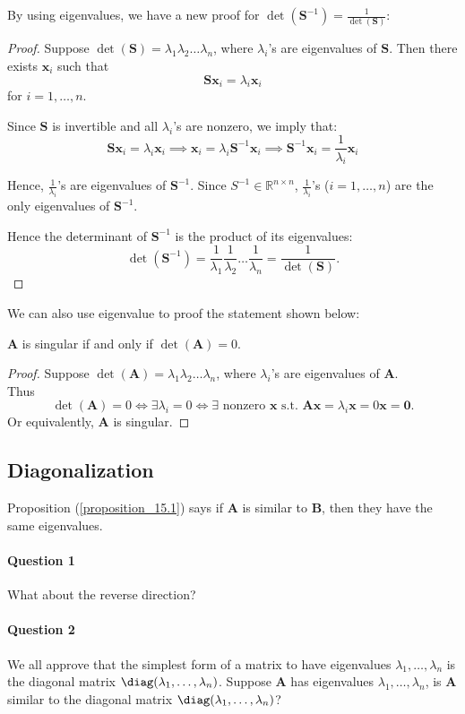 By using eigenvalues, we have a new proof for $\det(\bm S^{-1})=\frac{1}{\det(\bm S)}$:
\begin{proof}
Suppose $\det(\bm S)=\lambda_1\lambda_2\dots\lambda_n$, where $\lambda_i$'s are eigenvalues of $\bm S$. Then there exists $\bm x_i$ such that
\[
\bm S\bm x_i=\lambda_i\bm x_i
\]
for $i=1,\dots,n$.

Since $\bm S$ is invertible and all $\lambda_i$'s are nonzero, we imply that:
\[
\bm S\bm x_i=\lambda_i\bm x_i
\implies
\bm x_i=\lambda_i\bm S^{-1}\bm x_i
\implies
\bm S^{-1}\bm x_i=\frac{1}{\lambda_i}\bm x_i
\]

Hence, $\frac{1}{\lambda_i}$'s are eigenvalues of $\bm S^{-1}$. Since $S^{-1}\in\mathbb{R}^{n\times n}$, $\frac{1}{\lambda_i}$'s ($i=1,\dots,n$) are the only eigenvalues of $\bm S^{-1}$.

Hence the determinant of $\bm S^{-1}$ is the product of its eigenvalues:
\[
\det(\bm S^{-1})=\frac{1}{\lambda_1}\frac{1}{\lambda_2}\dots\frac{1}{\lambda_n}=\frac{1}{\det(\bm S)}.
\]
\end{proof}
We can also use eigenvalue to proof the statement shown below:
\begin{proposition}
$\bm A$ is singular if and only if $\det(\bm A)=0.$
\end{proposition}
\begin{proof}
Suppose $\det(\bm A)=\lambda_1\lambda_2\dots\lambda_n$, where $\lambda_i$'s are eigenvalues of $\bm A$.\\
Thus
\[
\det(\bm A)=0\Longleftrightarrow
\exists\lambda_i=0\Longleftrightarrow
\exists\text{ nonzero }\bm x\text{ s.t. }\bm A\bm x=\lambda_i\bm x=0\bm x=\bm 0.
\]
Or equivalently, $\bm A$ is singular.
\end{proof}

\subsection{Diagonalization}
Proposition (\ref{proposition_15.1}) says if $\bm A$ is similar to $
\bm B$, then they have the same eigenvalues.
\paragraph{Question 1} What about the reverse direction?
\paragraph{Question 2} We all approve that the simplest form of a matrix to have eigenvalues $\lambda_1,\dots,\lambda_n$ is the diagonal matrix $\diag(\lambda_1,\dots,\lambda_n)$. Suppose $\bm A$ has eigenvalues $\lambda_1,\dots,\lambda_n$, is $\bm A$ similar to the diagonal matrix $\diag(\lambda_1,\dots,\lambda_n)$?


